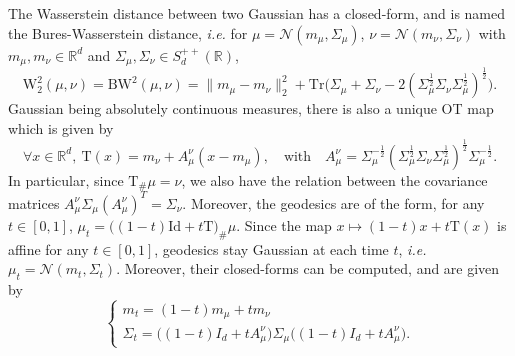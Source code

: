\documentclass[twoside]{article}
\newcommand{\cN}{\mathcal{N}}
\newcommand{\W}{\mathrm{W}}
\newcommand{\R}{\mathbb{R}}
\newcommand{\T}{\mathrm{T}}
\newcommand{\id}{\mathrm{Id}}
\newcommand{\tr}{\mathrm{Tr}}
\newcommand{\bw}{\mathrm{BW}}
\begin{document}
The Wasserstein distance between two Gaussian has a closed-form, and is named the Bures-Wasserstein distance, \emph{i.e.} for $\mu=\cN(m_\mu,\Sigma_\mu)$, $\nu=\cN(m_\nu,\Sigma_\nu)$ with $m_\mu,m_\nu\in\R^d$ and $\Sigma_\mu,\Sigma_\nu\in S_d^{++}(\R)$,
\begin{equation}
    \W_2^2(\mu,\nu) = \bw^2(\mu,\nu) = \|m_\mu-m_\nu\|_2^2 + \tr\big(\Sigma_\mu + \Sigma_\nu - 2 (\Sigma_\mu^{\frac12}\Sigma_\nu\Sigma_\mu^{\frac12})^{\frac12}\big).
\end{equation}
Gaussian being absolutely continuous measures, there is also a unique OT map which is given by
\begin{equation}
    \forall x\in \R^d,\ \T(x) = m_\nu + A_\mu^\nu(x-m_\mu), \quad \text{with}\quad A_\mu^\nu = \Sigma_\mu^{-\frac12}(\Sigma_\mu^{\frac12}\Sigma_\nu \Sigma_\mu^{\frac12})^{\frac12} \Sigma_\mu^{-\frac12}.
\end{equation}
In particular, since $\T_\#\mu=\nu$, we also have the relation between the covariance matrices $A_\mu^\nu \Sigma_\mu (A_\mu^\nu)^T = \Sigma_\nu$. Moreover, the geodesics are of the form, for any $t\in [0,1]$, $\mu_t = \big((1-t)\id + t\T\big)_\#\mu$. Since the map $x\mapsto (1-t)x+ t \T(x)$ is affine for any $t\in [0,1]$, geodesics stay Gaussian at each time $t$, \emph{i.e.} $\mu_t=\cN(m_t,\Sigma_t)$. Moreover, their closed-forms can be computed, and are given by \citep{altschuler2021averaging}
\begin{equation}
    \begin{cases}
        m_t = (1-t)m_\mu + tm_\nu \\
        \Sigma_t = \big((1-t) I_d + t A_\mu^\nu\big)\Sigma_\mu\big((1-t)I_d + t A_\mu^\nu\big).
    \end{cases}    
\end{equation}
\end{document}
